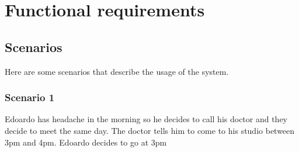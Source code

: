 \section{Functional requirements}
\subsection{Scenarios}
Here are some scenarios that describe the usage of the system.
\subsubsection{Scenario 1} \label{scenario:1}
Edoardo has headache in the morning so he decides to call his doctor and they decide to meet the same day. The doctor tells him to come to his studio between 3pm and 4pm. Edoardo decides to go at 3pm 
